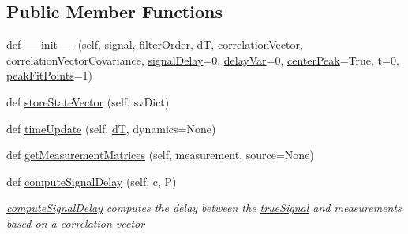 \subsection*{Public Member Functions}
\begin{DoxyCompactItemize}
\item 
def \hyperlink{classSignalCorrelationSubstate_1_1CorrelationFilter_a861f8f7e6e50ea1f1f3bcd397458cc25}{\+\_\+\+\_\+init\+\_\+\+\_\+} (self, signal, \hyperlink{classSignalCorrelationSubstate_1_1CorrelationFilter_a4b49b7bd52c1346cca0342942a5bbbb6}{filter\+Order}, \hyperlink{classSignalCorrelationSubstate_1_1CorrelationFilter_a500e4823c314d54a21f236b6b896c8eb}{dT}, correlation\+Vector, correlation\+Vector\+Covariance, \hyperlink{classSignalCorrelationSubstate_1_1CorrelationFilter_a01e35890dee1d79bd0e4f9e82cb16e3f}{signal\+Delay}=0, \hyperlink{classSignalCorrelationSubstate_1_1CorrelationFilter_a34d52beb18c131f2305689d48f612a5a}{delay\+Var}=0, \hyperlink{classSignalCorrelationSubstate_1_1CorrelationFilter_a8e53182c2ff431a6a545a265cda6ba48}{center\+Peak}=True, t=0, \hyperlink{classSignalCorrelationSubstate_1_1CorrelationFilter_a85a73739e9bb0a7f20886a812a3afa83}{peak\+Fit\+Points}=1)
\item 
def \hyperlink{classSignalCorrelationSubstate_1_1CorrelationFilter_a94b5211aa159578344974b52f3b9f92e}{store\+State\+Vector} (self, sv\+Dict)
\item 
def \hyperlink{classSignalCorrelationSubstate_1_1CorrelationFilter_a07a8c37a30c3d0a057049e0ff2eac67f}{time\+Update} (self, \hyperlink{classSignalCorrelationSubstate_1_1CorrelationFilter_a500e4823c314d54a21f236b6b896c8eb}{dT}, dynamics=None)
\item 
def \hyperlink{classSignalCorrelationSubstate_1_1CorrelationFilter_ae7338456be781e322eba5bce4e41199f}{get\+Measurement\+Matrices} (self, measurement, source=None)
\item 
def \hyperlink{classSignalCorrelationSubstate_1_1CorrelationFilter_ace04b6e310f321192715c76ec2ac6b52}{compute\+Signal\+Delay} (self, c, P)
\begin{DoxyCompactList}\small\item\em \hyperlink{classSignalCorrelationSubstate_1_1CorrelationFilter_ace04b6e310f321192715c76ec2ac6b52}{compute\+Signal\+Delay} computes the delay between the \hyperlink{classSignalCorrelationSubstate_1_1CorrelationFilter_a67ff75effd8a8a7e34f0f3e8c56ef491}{true\+Signal} and measurements based on a correlation vector \end{DoxyCompactList}\item 

\end{DoxyCompactItemize}
